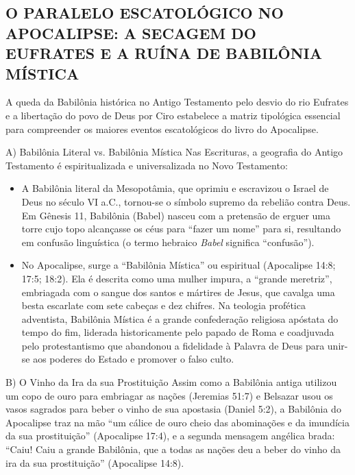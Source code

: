 \subsection{O PARALELO ESCATOLÓGICO NO APOCALIPSE: A SECAGEM DO EUFRATES E A RUÍNA DE BABILÔNIA MÍSTICA}


A queda da Babilônia histórica no Antigo Testamento pelo desvio do rio Eufrates e a libertação do povo de Deus por Ciro estabelece a matriz tipológica essencial para compreender os maiores eventos escatológicos do livro do Apocalipse.

A) Babilônia Literal vs. Babilônia Mística
Nas Escrituras, a geografia do Antigo Testamento é espiritualizada e universalizada no Novo Testamento:
\begin{itemize}
  \item A Babilônia literal da Mesopotâmia, que oprimiu e escravizou o Israel de Deus no século VI a.C., tornou-se o símbolo supremo da rebelião contra Deus. Em Gênesis 11, Babilônia (Babel) nasceu com a pretensão de erguer uma torre cujo topo alcançasse os céus para ``fazer um nome'' para si, resultando em confusão linguística (o termo hebraico \textit{Babel} significa ``confusão'').
  \item No Apocalipse, surge a ``Babilônia Mística'' ou espiritual (Apocalipse 14:8; 17:5; 18:2). Ela é descrita como uma mulher impura, a ``grande meretriz'', embriagada com o sangue dos santos e mártires de Jesus, que cavalga uma besta escarlate com sete cabeças e dez chifres. Na teologia profética adventista, Babilônia Mística é a grande confederação religiosa apóstata do tempo do fim, liderada historicamente pelo papado de Roma e coadjuvada pelo protestantismo que abandonou a fidelidade à Palavra de Deus para unir-se aos poderes do Estado e promover o falso culto.
\end{itemize}


B) O Vinho da Ira da sua Prostituição
Assim como a Babilônia antiga utilizou um copo de ouro para embriagar as nações (Jeremias 51:7) e Belsazar usou os vasos sagrados para beber o vinho de sua apostasia (Daniel 5:2), a Babilônia do Apocalipse traz na mão ``um cálice de ouro cheio das abominações e da imundícia da sua prostituição'' (Apocalipse 17:4), e a segunda mensagem angélica brada: ``Caiu! Caiu a grande Babilônia, que a todas as nações deu a beber do vinho da ira da sua prostituição'' (Apocalipse 14:8).

